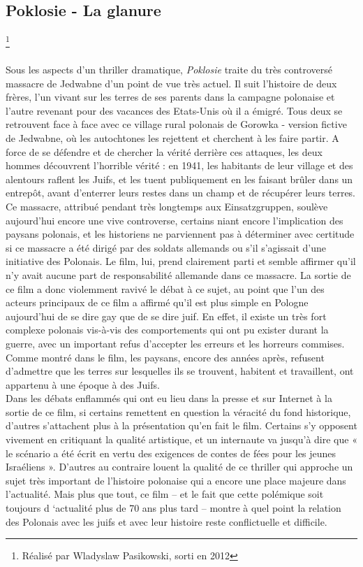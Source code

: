 \documentclass[12pt, twocolumn]{amsart}
\begin{document}
\subsection*{Poklosie - La glanure}\footnote{Réalisé par Wladyslaw Pasikowski, sorti en 2012}
\paragraph{}
Sous les aspects d’un thriller dramatique, \emph{Poklosie} traite du très controversé massacre de Jedwabne d’un point de vue très actuel. Il suit l’histoire de deux frères, l’un vivant sur les terres de ses parents dans la campagne polonaise et l’autre revenant pour des vacances des Etats-Unis où il a émigré. Tous deux se retrouvent face à face avec ce village rural polonais de Gorowka - version fictive de Jedwabne, où les autochtones les rejettent et cherchent à les faire partir. A force de se défendre et de chercher la vérité derrière ces attaques, les deux hommes découvrent l’horrible vérité : en 1941, les habitants de leur village et des alentours raflent les Juifs, et les tuent publiquement en les faisant brûler dans un entrepôt, avant d’enterrer leurs restes dans un champ et de récupérer leurs terres. \\
Ce massacre, attribué pendant très longtemps aux  Einsatzgruppen, soulève aujourd’hui encore une vive controverse, certains niant encore l’implication des paysans polonais, et les historiens ne parviennent pas à déterminer avec certitude si ce massacre a été dirigé par des soldats allemands ou s’il s’agissait d’une initiative des Polonais. Le film, lui, prend clairement parti et semble affirmer qu’il n’y avait aucune part de responsabilité allemande dans ce massacre. La sortie de ce film a donc violemment ravivé le débat à ce sujet, au point que l’un des acteurs principaux de ce film a affirmé qu’il est plus simple en Pologne aujourd’hui de se dire gay que de se dire juif. En effet, il existe un très fort complexe polonais vis-à-vis des comportements qui ont pu exister durant la guerre, avec un important refus d’accepter les erreurs et les horreurs commises. Comme montré dans le film, les paysans, encore des années après, refusent d’admettre que les terres sur lesquelles ils se trouvent, habitent et travaillent, ont appartenu à une époque à des Juifs. 
\\
Dans les débats enflammés qui ont eu lieu dans la presse et sur Internet à la sortie de ce film, si certains remettent en question la véracité du fond historique, d’autres s’attachent plus à la présentation qu’en fait le film. Certains s’y opposent vivement en critiquant la qualité artistique, et un internaute va jusqu’à dire que « le scénario a été écrit en vertu des exigences de contes de fées pour les jeunes Israéliens ». D’autres au contraire louent la qualité de ce thriller qui approche un sujet très important de l’histoire polonaise qui a encore une place majeure dans l’actualité. Mais plus que tout, ce film – et le fait que cette polémique soit toujours d ‘actualité plus de 70 ans plus tard – montre à quel point la relation des Polonais avec les juifs et avec leur histoire reste conflictuelle et difficile. 
\end{document}
